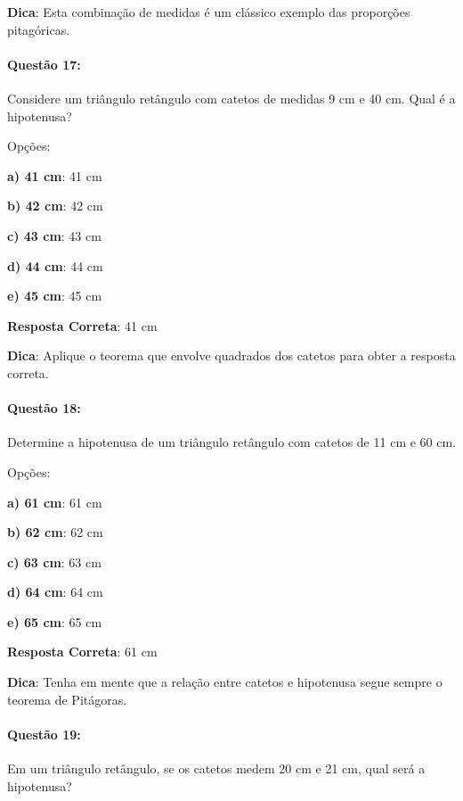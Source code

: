\documentclass{article}
\begin{document}
\vspace{\baselineskip}\textbf{Dica}: Esta combinação de medidas é um clássico exemplo das proporções pitagóricas.

\paragraph{Questão 17:}
{Considere um triângulo retângulo com catetos de medidas 9 cm e 40 cm. Qual é a hipotenusa?}

\vspace{\baselineskip}Opções:

\vspace{\baselineskip}\textbf{a) 41 cm}: 41 cm 

\textbf{b) 42 cm}: 42 cm 

\textbf{c) 43 cm}: 43 cm 

\textbf{d) 44 cm}: 44 cm 

\textbf{e) 45 cm}: 45 cm 

\vspace{\baselineskip}\textbf{Resposta Correta}: 41 cm

\vspace{\baselineskip}\textbf{Dica}: Aplique o teorema que envolve quadrados dos catetos para obter a resposta correta.

\paragraph{Questão 18:}
{Determine a hipotenusa de um triângulo retângulo com catetos de 11 cm e 60 cm.}

\vspace{\baselineskip}Opções:

\vspace{\baselineskip}\textbf{a) 61 cm}: 61 cm 

\textbf{b) 62 cm}: 62 cm 

\textbf{c) 63 cm}: 63 cm 

\textbf{d) 64 cm}: 64 cm 

\textbf{e) 65 cm}: 65 cm 

\vspace{\baselineskip}\textbf{Resposta Correta}: 61 cm

\vspace{\baselineskip}\textbf{Dica}: Tenha em mente que a relação entre catetos e hipotenusa segue sempre o teorema de Pitágoras.

\paragraph{Questão 19:}
{Em um triângulo retângulo, se os catetos medem 20 cm e 21 cm, qual será a hipotenusa?}
\end{document}
